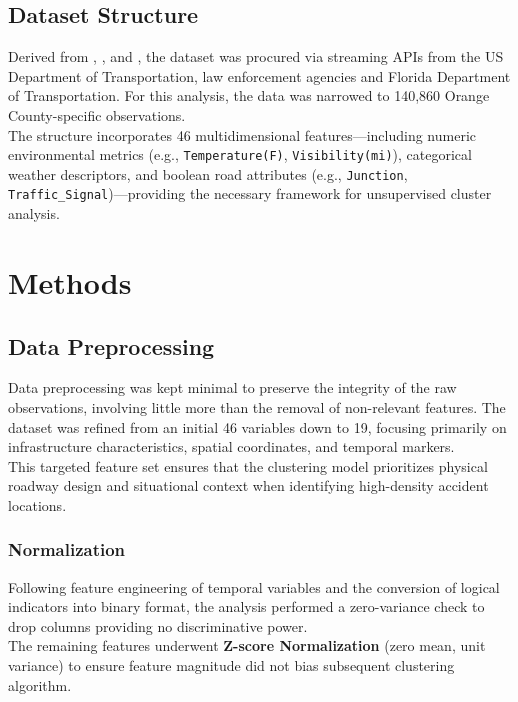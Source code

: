 \documentclass[conference]{IEEEtran}
\begin{document}
\subsection{\textbf{Dataset Structure}}
\indent Derived from \cite{moosavi2019countrywide}, \cite{moosavi2019accident}, and \cite{fdot_geospatial}, the dataset was procured via streaming APIs from the US Department of Transportation, law enforcement agencies and Florida Department of Transportation. For this analysis, the data was narrowed to 140,860 Orange County-specific observations.\\
\indent The structure incorporates 46 multidimensional features—including numeric environmental metrics (e.g., \texttt{Temperature(F)}, \texttt{Visibility(mi)}), categorical weather descriptors, and boolean road attributes (e.g., \texttt{Junction}, \texttt{Traffic\_Signal})—providing the necessary framework for unsupervised cluster analysis.

\vspace{2mm}

\section{\textbf{Methods}}

\subsection{\textbf{Data Preprocessing}}
Data preprocessing was kept minimal to preserve the integrity of the raw observations, involving little more than the removal of non-relevant features. The dataset was refined from an initial 46 variables down to 19, focusing primarily on infrastructure characteristics, spatial coordinates, and temporal markers.\\
\indent This targeted feature set ensures that the clustering model prioritizes physical roadway design and situational context when identifying high-density accident locations.

\subsubsection*{\textbf{Normalization}}
\indent Following feature engineering of temporal variables and the conversion of logical indicators into binary format, the analysis performed a zero-variance check to drop columns providing no discriminative power.\\
\indent The remaining features underwent \textbf{Z-score Normalization} \cite{ISLR2} (zero mean, unit variance) to ensure feature magnitude did not bias subsequent clustering algorithm.
\end{document}
